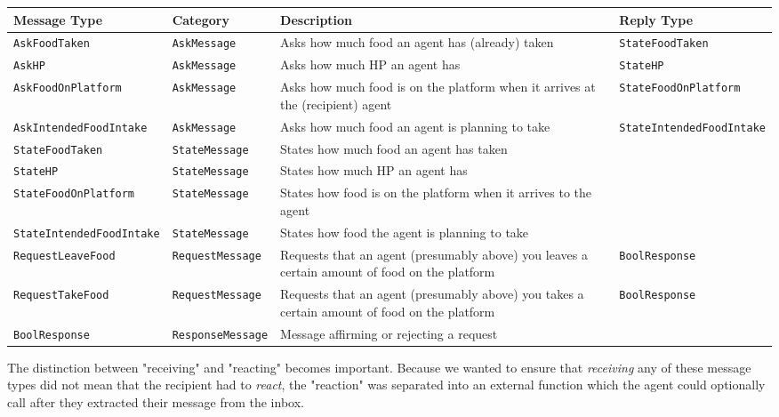 \begin{center}
\begin{longtable}{p{4cm}p{2.5cm}p{4cm}p{4cm}}
 \hline
 \textbf{Message Type} & \textbf{Category} & \textbf{Description} & \textbf{Reply Type} \\ [0.5ex] 
 \hline\hline
 \texttt{AskFoodTaken} & \texttt{AskMessage} & Asks how much food an agent has (already) taken
 & \texttt{StateFoodTaken} \\ 
 \hline
 \texttt{AskHP} & \texttt{AskMessage} & Asks how much HP an agent has & \texttt{StateHP} \\ 
  \hline
 \texttt{AskFoodOnPlatform} & \texttt{AskMessage} & Asks how much food is on the platform when it arrives at the (recipient) agent & \texttt{StateFoodOnPlatform} \\ 
 \hline
 \texttt{AskIntendedFoodIntake} & \texttt{AskMessage} & Asks how much food an agent is planning to take & \texttt{StateIntendedFoodIntake} \\ 
 \hline
 \texttt{StateFoodTaken} & \texttt{StateMessage} & States how much food an agent has taken &   \\
 \hline
 \texttt{StateHP} & \texttt{StateMessage} & States how much HP an agent has &   \\
 \hline
 \texttt{StateFoodOnPlatform} & \texttt{StateMessage} & States how food is on the platform when it arrives to the agent &  
 \\
 \hline
 \texttt{StateIntendedFoodIntake} & \texttt{StateMessage} & States how food the agent is planning to take &  
 \\
 \hline
 \texttt{RequestLeaveFood} & \texttt{RequestMessage} & Requests that an agent (presumably above) you leaves a certain amount of food on the platform & \texttt{BoolResponse}
 \\
 \hline
 \texttt{RequestTakeFood} & \texttt{RequestMessage} & Requests that an agent (presumably above) you takes a certain amount of food on the platform & \texttt{BoolResponse}
 \\
 \hline
 \texttt{BoolResponse} & \texttt{ResponseMessage} & Message affirming or rejecting a request &  
\end{longtable}
\end{center}
The distinction between "receiving" and "reacting" becomes important. Because we wanted to ensure that \textit{receiving} any of these message types did not mean that the recipient had to \textit{react}, the "reaction" was separated into an external function which the agent could optionally call after they extracted their message from the inbox. \newline
